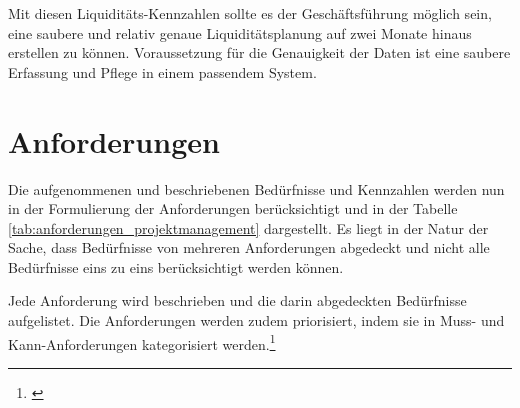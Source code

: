 Mit diesen Liquiditäts-Kennzahlen sollte es der Geschäftsführung möglich sein,
eine saubere und relativ genaue Liquiditätsplanung auf zwei Monate hinaus
erstellen zu können. Voraussetzung für die Genauigkeit der Daten ist eine
saubere Erfassung und Pflege in einem passendem System.

\clearpage

\section{Anforderungen}\label{chap:sec_anforderungen}
Die aufgenommenen und beschriebenen Bedürfnisse und Kennzahlen werden nun in der Formulierung
der Anforderungen berücksichtigt und in der Tabelle \ref{tab:anforderungen_projektmanagement} 
dargestellt. Es liegt in der Natur der Sache, dass Bedürfnisse von mehreren 
Anforderungen abgedeckt und nicht alle Bedürfnisse eins zu eins berücksichtigt 
werden können.

Jede Anforderung wird beschrieben und die darin abgedeckten Bedürfnisse aufgelistet. 
Die Anforderungen werden zudem priorisiert, indem sie in Muss- und Kann-Anforderungen 
kategorisiert werden.\footnote{\citealp*[Vgl.][S. 32]{hobel2006gabler}}

